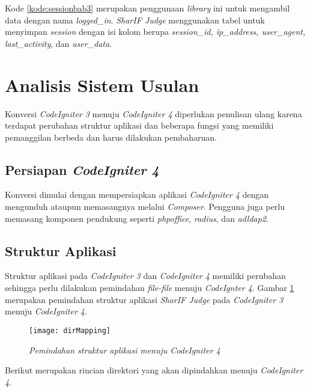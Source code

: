 Kode \ref{kode:sessionbab3} merupakan penggunaan \textit{library} ini untuk mengambil data dengan nama \textit{logged\_in}. \textit{SharIF Judge} menggunakan tabel untuk menyimpan \textit{session} dengan isi kolom berupa \textit{session\_id, ip\_address, user\_agent, last\_activity}, dan \textit{user\_data}.

\section{Analisis Sistem Usulan}
Konversi \textit{CodeIgniter 3} menuju \textit{CodeIgniter 4} diperlukan penulisan ulang karena terdapat perubahan struktur aplikasi dan beberapa fungsi yang memiliki pemanggilan berbeda dan harus dilakukan pembaharuan.
\subsection{Persiapan \textit{CodeIgniter 4}} Konversi dimulai dengan mempersiapkan aplikasi \textit{CodeIgniter 4} dengan mengunduh ataupun memasangnya melalui \textit{Composer}. Pengguna juga perlu memasang komponen pendukung seperti \textit{phpoffice}, \textit{radius}, dan \textit{adldap2}.

\subsection{Struktur Aplikasi}
Struktur aplikasi pada \textit{CodeIgniter 3} dan \textit{CodeIgniter 4} memiliki perubahan sehingga perlu dilakukan pemindahan \textit{file-file} menuju \textit{CodeIgnter 4}. Gambar \ref{fig:dirMapping} merupakan pemindahan struktur aplikasi \textit{SharIF Judge} pada \textit{CodeIgniter 3} menuju \textit{CodeIgniter 4}.
\begin{figure}[H]
	\centering  
	\texttt{[image: dirMapping]}  
	\caption[\textit{Pemindahan struktur aplikasi menuju \textit{CodeIgniter 4}}]{\textit{Pemindahan struktur aplikasi menuju \textit{CodeIgniter 4}}} 
	\label{fig:dirMapping} 
\end{figure} 

Berikut merupakan rincian direktori yang akan dipindahkan menuju \textit{CodeIgniter 4}.

